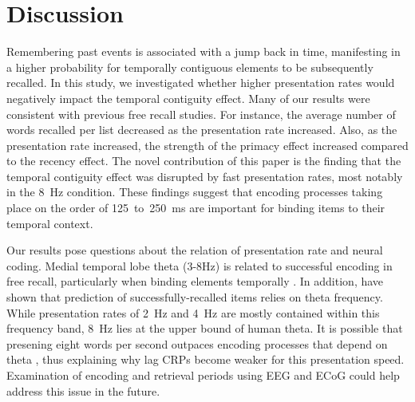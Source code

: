 \documentclass[10pt,letterpaper]{article}
\begin{document}
\section{Discussion}

Remembering past events is associated with a jump back in time, manifesting in
a higher probability for temporally contiguous elements to be subsequently
recalled. In this study, we investigated whether higher presentation rates
would negatively impact the temporal contiguity effect. 
Many of our results were consistent with previous free recall studies. For
instance, the average number of words recalled per list decreased as the
presentation rate increased. Also, as the presentation rate increased, the
strength of the primacy effect increased compared to the recency effect.
The novel contribution of this paper is the finding that 
the temporal contiguity effect was disrupted by fast presentation rates, most
notably in the 8~Hz condition.   These findings suggest that encoding
processes taking place on the order of 125~to~250~ms are important for binding
items to their temporal context.

Our results pose questions about the relation of presentation rate and neural
coding. Medial temporal lobe theta (3-8Hz) is related to successful encoding
in free recall, particularly when binding elements temporally
\cite{NyhuCurr10,SedeEtal03}. In addition,  have shown that
prediction of successfully-recalled items relies on theta frequency. While
presentation rates of 2~Hz and 4~Hz are mostly contained within this frequency
band, 8~Hz lies at the upper bound of human theta. It is possible that
presening eight words per second outpaces encoding processes that depend on
theta \cite{HassEtal02}, thus explaining why lag CRPs become weaker for this
presentation speed. Examination of encoding and retrieval periods using EEG
and ECoG could help address this issue in the future.

\nocite{GudeEtal09}




\setlength{\bibleftmargin}{.125in}
\setlength{\bibindent}{-\bibleftmargin}


\end{document}
